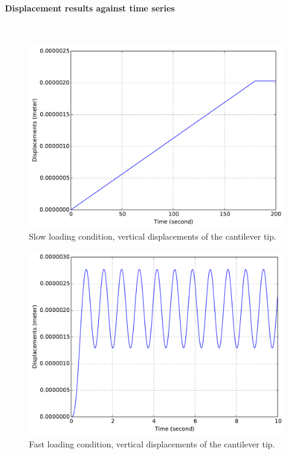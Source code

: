 \documentclass[fleqn,11pt]{article}
\begin{document}
\paragraph{Displacement results against time series} ~

\begin{figure}[!htb]
  \centering
  \includegraphics[width=12cm]{../Figure-files/_Chapter_Appendix_Illustrative_Examples/brick-1element-slowLoading.pdf}
  \caption{Slow loading condition, vertical displacements of the cantilever tip.}
  \label{fig_brick1-slow}
\end{figure}


\begin{figure}[!htb]
  \centering
  \includegraphics[width=12cm]{../Figure-files/_Chapter_Appendix_Illustrative_Examples/brick-1element-fastLoading.pdf}
  \caption{Fast loading condition, vertical displacements of the cantilever tip.}
  \label{fig_brick1-fast}
\end{figure}
\end{document}

